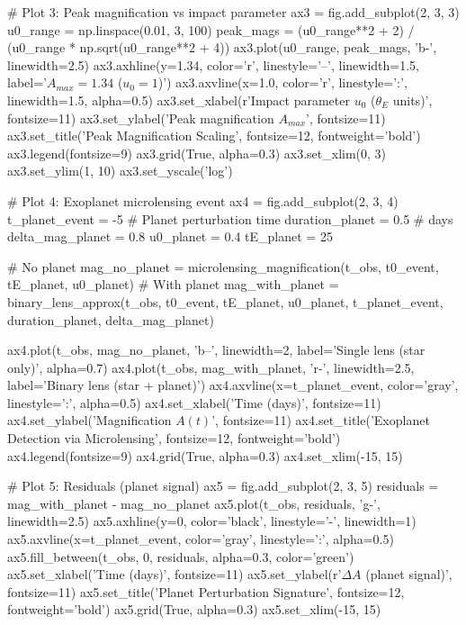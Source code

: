 \documentclass[11pt,a4paper]{article}
\begin{document}
\begin{pycode}
# Plot 3: Peak magnification vs impact parameter
ax3 = fig.add_subplot(2, 3, 3)
u0_range = np.linspace(0.01, 3, 100)
peak_mags = (u0_range**2 + 2) / (u0_range * np.sqrt(u0_range**2 + 4))
ax3.plot(u0_range, peak_mags, 'b-', linewidth=2.5)
ax3.axhline(y=1.34, color='r', linestyle='--', linewidth=1.5,
           label='$A_{max} = 1.34$ ($u_0 = 1$)')
ax3.axvline(x=1.0, color='r', linestyle=':', linewidth=1.5, alpha=0.5)
ax3.set_xlabel(r'Impact parameter $u_0$ ($\theta_E$ units)', fontsize=11)
ax3.set_ylabel('Peak magnification $A_{max}$', fontsize=11)
ax3.set_title('Peak Magnification Scaling', fontsize=12, fontweight='bold')
ax3.legend(fontsize=9)
ax3.grid(True, alpha=0.3)
ax3.set_xlim(0, 3)
ax3.set_ylim(1, 10)
ax3.set_yscale('log')

# Plot 4: Exoplanet microlensing event
ax4 = fig.add_subplot(2, 3, 4)
t_planet_event = -5  # Planet perturbation time
duration_planet = 0.5  # days
delta_mag_planet = 0.8
u0_planet = 0.4
tE_planet = 25

# No planet
mag_no_planet = microlensing_magnification(t_obs, t0_event, tE_planet, u0_planet)
# With planet
mag_with_planet = binary_lens_approx(t_obs, t0_event, tE_planet, u0_planet,
                                    t_planet_event, duration_planet, delta_mag_planet)

ax4.plot(t_obs, mag_no_planet, 'b--', linewidth=2, label='Single lens (star only)', alpha=0.7)
ax4.plot(t_obs, mag_with_planet, 'r-', linewidth=2.5, label='Binary lens (star + planet)')
ax4.axvline(x=t_planet_event, color='gray', linestyle=':', alpha=0.5)
ax4.set_xlabel('Time (days)', fontsize=11)
ax4.set_ylabel('Magnification $A(t)$', fontsize=11)
ax4.set_title('Exoplanet Detection via Microlensing', fontsize=12, fontweight='bold')
ax4.legend(fontsize=9)
ax4.grid(True, alpha=0.3)
ax4.set_xlim(-15, 15)

# Plot 5: Residuals (planet signal)
ax5 = fig.add_subplot(2, 3, 5)
residuals = mag_with_planet - mag_no_planet
ax5.plot(t_obs, residuals, 'g-', linewidth=2.5)
ax5.axhline(y=0, color='black', linestyle='-', linewidth=1)
ax5.axvline(x=t_planet_event, color='gray', linestyle=':', alpha=0.5)
ax5.fill_between(t_obs, 0, residuals, alpha=0.3, color='green')
ax5.set_xlabel('Time (days)', fontsize=11)
ax5.set_ylabel(r'$\Delta A$ (planet signal)', fontsize=11)
ax5.set_title('Planet Perturbation Signature', fontsize=12, fontweight='bold')
ax5.grid(True, alpha=0.3)
ax5.set_xlim(-15, 15)


\end{pycode}
\end{document}
